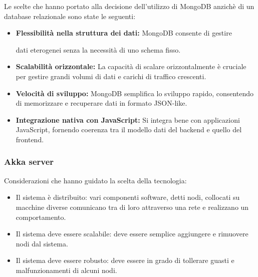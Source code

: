 Le scelte che hanno portato alla decisione dell'utilizzo di MongoDB anzichè
di un database relazionale sono state le seguenti:

\begin{itemize}
      \item \textbf{Flessibilità nella struttura dei dati:} MongoDB consente di gestire

            dati eterogenei senza la necessità di uno schema fisso.

      \item \textbf{Scalabilità orizzontale:} La capacità di scalare orizzontalmente è
            cruciale per gestire grandi volumi di dati e carichi di traffico crescenti.

      \item \textbf{Velocità di sviluppo:} MongoDB semplifica lo sviluppo rapido,
            consentendo di memorizzare e recuperare dati in formato JSON-like.

      \item \textbf{Integrazione nativa con JavaScript:} Si integra bene con applicazioni
            JavaScript, fornendo coerenza tra il modello dati del backend e quello del frontend.
\end{itemize}



\subsubsection{Akka server}



Considerazioni che hanno guidato la scelta della tecnologia:
\begin{itemize}
      \item Il sistema è distribuito: vari componenti software, detti nodi, collocati su macchine diverse comunicano tra di loro attraverso una rete e realizzano un comportamento.
      \item Il sistema deve essere scalabile: deve essere semplice aggiungere e rimuovere nodi dal sistema.
      \item Il sistema deve essere robusto: deve essere in grado di tollerare guasti e malfunzionamenti di alcuni nodi.
\end{itemize}


